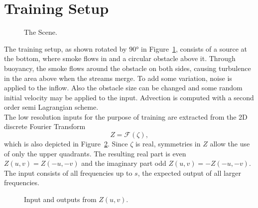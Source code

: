 \documentclass[sigconf]{acmart}
\begin{document}
\section{Training Setup}\label{sec:training}
\begin{figure}
	\caption{The Scene.}
	\label{trainingScene}
\end{figure}
The training setup, as shown rotated by $\ang{90}$ in Figure~\ref{trainingScene}, consists of a source at the bottom, where smoke flows in and a circular obstacle above it. Through buoyancy, the smoke flows around the obstacle on both sides, causing turbulence in the area above when the streams merge. To add some variation, noise is applied to the inflow. Also the obstacle size can be changed and some random initial velocity may be applied to the input.
Advection is computed with a second order semi Lagrangian scheme.\\
The low resolution inputs for the purpose of training are extracted from the 2D discrete Fourier Transform 
\[
Z = \mathcal{F} (\zeta),
\]
which is also depicted in Figure~\ref{lowFreqs}.
Since $\zeta$ is real, symmetries in $Z$ allow the use of only the upper quadrants. The resulting real part is even $Z(u,v)=Z(-u,-v)$ and the imaginary part odd $Z(u,v)=-Z(-u,-v)$. The input consists of all frequencies up to $s$, the expected output of all larger frequencies.
\begin{figure}
	\caption{Input and outputs from $Z(u,v)$.}
	\label{lowFreqs}
\end{figure}
\end{document}
